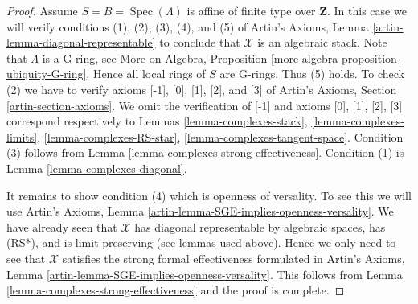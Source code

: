\documentclass[10pt,a4paper]{amsart}
\theoremstyle{plain}
\theoremstyle{definition}
\theoremstyle{remark}
\numberwithin{equation}{subsection}
\def\Spec{\mathop{\mathrm{Spec}}}
\begin{document}
\begin{proof}
\medskip\noindent
Assume $S = B = \Spec(\Lambda)$ is affine of finite type over $\mathbf{Z}$.
In this case we will verify conditions (1), (2), (3), (4), and (5) of
Artin's Axioms, Lemma \ref{artin-lemma-diagonal-representable}
to conclude that $\mathcal{X}$ is an algebraic stack.
Note that $\Lambda$ is a G-ring, see
More on Algebra, Proposition \ref{more-algebra-proposition-ubiquity-G-ring}.
Hence all local rings of $S$ are G-rings. Thus (5) holds.
To check (2) we have to verify axioms [-1], [0], [1], [2], and [3]
of Artin's Axioms, Section \ref{artin-section-axioms}.
We omit the verification of [-1] and axioms
[0], [1], [2], [3] correspond respectively to
Lemmas \ref{lemma-complexes-stack},
\ref{lemma-complexes-limits},
\ref{lemma-complexes-RS-star},
\ref{lemma-complexes-tangent-space}.
Condition (3) follows from Lemma \ref{lemma-complexes-strong-effectiveness}.
Condition (1) is Lemma \ref{lemma-complexes-diagonal}.

\medskip\noindent
It remains to show condition (4) which is openness of versality.
To see this we will use
Artin's Axioms, Lemma \ref{artin-lemma-SGE-implies-openness-versality}.
We have already seen that $\mathcal{X}$ has diagonal
representable by algebraic spaces, has (RS*), and is limit preserving
(see lemmas used above).
Hence we only need to see that $\mathcal{X}$ satisfies the strong
formal effectiveness formulated in
Artin's Axioms, Lemma \ref{artin-lemma-SGE-implies-openness-versality}.
This follows from Lemma \ref{lemma-complexes-strong-effectiveness}
and the proof is complete.
\end{proof}



\end{document}
